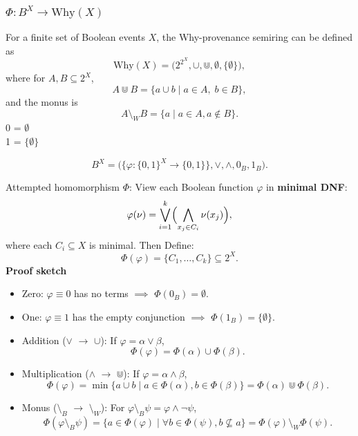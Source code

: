 \subsubsection{\(\Phi : B^X \to \mathrm{Why}(X)\)}

For a finite set of Boolean events \(X\), the Why-provenance semiring can be defined as
\[
\mathrm{Why}(X) = \bigl(2^{2^X},\cup,\Cup,\emptyset,\{\emptyset\}\bigr),
\]
where for \(A,B\subseteq 2^X\),
\[
A \Cup B = \{a \cup b \mid a\in A,\;b\in B\},
\]
and the monus is
\[
A \setminus_W B = \{ a \mid a \in A,  a \notin B \}.
\]
0 = \(\emptyset\)\\  
1 = \(\{\emptyset\}\)




 
\[
B^X = \bigl(\{\varphi:\{0,1\}^X\to\{0,1\}\},\vee,\wedge,0_B,1_B\bigr).
\]

Attempted homomorphism \(\Phi\):
View each Boolean function \(\varphi\) in \textbf{minimal DNF}:
   \[
   \varphi(\nu)
   = \bigvee_{i=1}^k \Bigl(\bigwedge_{x_j\in C_i} \nu(x_j)\Bigr),
   \]
   where each \(C_i\subseteq X\) is minimal.\newline
Then Define:
   \[
   \Phi(\varphi) = \{C_1,\dots,C_k\}\subseteq 2^X.
   \]
\textbf{Proof sketch}
\begin{itemize}
\item Zero:  
   \(\varphi\equiv 0\) has no terms $\implies$ \(\Phi(0_B)=\emptyset\).

\item One:  
   \(\varphi\equiv 1\) has the empty conjunction $\implies$ \(\Phi(1_B)=\{\emptyset\}\).

\item Addition (\(\vee\) $\rightarrow$ \(\cup\)):  
   If \(\varphi=\alpha\vee\beta\),
   \[
   \Phi(\varphi) = \Phi(\alpha)\cup\Phi(\beta).
   \]

\item Multiplication (\(\wedge\) $\rightarrow$  \(\Cup\)):  
   If \(\varphi=\alpha\wedge\beta\),
   \[
   \Phi(\varphi)
   = \min\{a\cup b\mid a\in\Phi(\alpha),b\in\Phi(\beta)\}
   = \Phi(\alpha)\Cup\Phi(\beta).
   \]

\item Monus (\(\setminus_B\) $\rightarrow$  \(\setminus_W\)):  
   For \(\varphi\setminus_B\psi = \varphi\wedge\neg\psi\),
   \[
   \Phi(\varphi\setminus_B\psi)
   = \{a\in\Phi(\varphi)\mid \forall b\in\Phi(\psi),b\nsubseteq a\}
   = \Phi(\varphi)\setminus_W\Phi(\psi).
   \]

\end{itemize}


